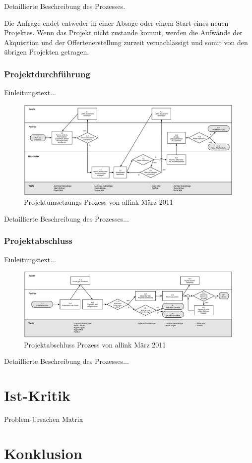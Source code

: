 Detaillierte Beschreibung des Prozesses.

Die Anfrage endet entweder in einer Absage oder einem Start eines neuen 
Projektes. Wenn das Projekt nicht zustande kommt, werden die Aufwände der
Akquisition und der Offertenerstellung zurzeit vernachlässigt und somit von
den übrigen Projekten getragen.

\clearpage

\subsubsection{Projektdurchführung}
Einleitungstext...

\begin{figure}[htbp]
\begin{center}
\includegraphics[width=0.99\textwidth,angle=0]{./bilder/02_ist_prozesse_arbeit.pdf}
\caption{Projektumsetzungs Prozess von allink März 2011}
\label{pic:02_ist_prozesse_arbeit}
\end{center}
\end{figure}

Detaillierte Beschreibung des Prozesses...

\clearpage

\subsubsection{Projektabschluss}
Einleitungstext...

\begin{figure}[htbp]
\begin{center}
\includegraphics[width=0.99\textwidth,angle=0]{./bilder/03_ist_prozesse_abschluss.pdf}
\caption{Projektabschluss Prozess von allink März 2011}
\label{pic:03_ist_prozesse_abschluss}
\end{center}
\end{figure}

Detaillierte Beschreibung des Prozesses...

\section{Ist-Kritik}
Problem-Ursachen Matrix

\section{Konklusion}